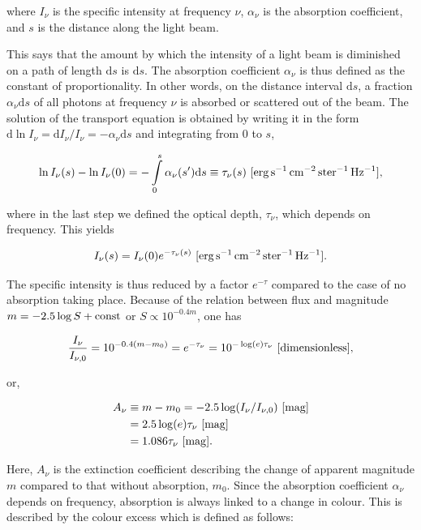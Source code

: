 \documentclass[a4paper,11pt]{article}
\begin{document}
{\noindent}where $I_\nu$ is the specific intensity at frequency $\nu$, $\alpha_\nu$ is the absorption coefficient, and $s$ is the distance along the light beam.

{\noindent}This says that the amount by which the intensity of a light beam is diminished on a path of length $\mathrm{d}s$ is $\mathrm{d}s$. The absorption coefficient $\alpha_\nu$ is thus defined as the constant of proportionality. In other words, on the distance interval $\mathrm{d}s$, a fraction $\alpha_\nu\mathrm{d}s$ of all photons at frequency $\nu$ is absorbed or scattered out of the beam. The solution of the transport equation is obtained by writing it in the form $\mathrm{d}\ln I_\nu=\mathrm{d}I_\nu/I_\nu=-\alpha_\nu\mathrm{d}s$ and integrating from $0$ to $s$,

\begin{align*}
    \ln I_\nu(s)-\ln I_\nu(0) = -\int\limits_0^s \alpha_\nu(s')\mathrm{d}s \equiv \tau_\nu(s) ~ [\rm erg\,s^{-1}\,cm^{-2}\,ster^{-1}\,Hz^{-1}],
\end{align*}

{\noindent}where in the last step we defined the optical depth, $\tau_\nu$, which depends on frequency. This yields

\begin{align*}
    I_\nu(s) = I_\nu(0)e^{-\tau_\nu(s)} ~ [\rm erg\,s^{-1}\,cm^{-2}\,ster^{-1}\,Hz^{-1}].
\end{align*}

{\noindent}The specific intensity is thus reduced by a factor $e^{-\tau}$ compared to the case of no absorption taking place. Because of the relation between flux and magnitude $m=-2.5\log S+{\rm const}$ or $S\propto 10^{-0.4m}$, one has

\begin{align*}
    \frac{I_\nu}{I_{\nu,0}} = 10^{-0.4(m-m_0)} = e^{-\tau_\nu} = 10^{-\log(e)\tau_\nu} ~ [{\rm dimensionless}],
\end{align*}

{\noindent}or,

\begin{align*}
    A_\nu &\equiv m-m_0 = -2.5\log(I_\nu/I_{\nu,0}) ~ [{\rm mag}] \\
          &= 2.5\log(e)\tau_\nu ~ [{\rm mag}] \\
          &= 1.086\tau_\nu ~ [{\rm mag}].
\end{align*}

{\noindent}Here, $A_\nu$ is the extinction coefficient describing the change of apparent magnitude $m$ compared to that without absorption, $m_0$. Since the absorption coefficient $\alpha_\nu$ depends on frequency, absorption is always linked to a change in colour. This is described by the colour excess which is defined as follows:
\end{document}
